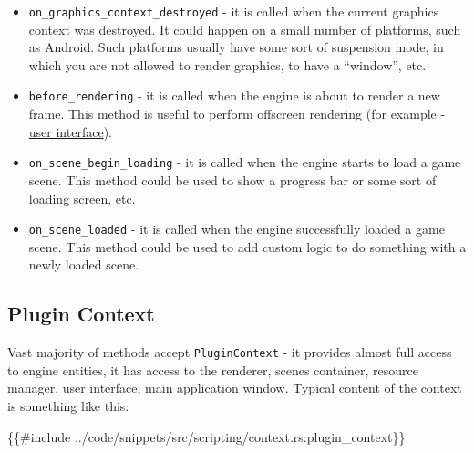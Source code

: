 \documentclass[
]{book}
\newenvironment{Shaded}{\begin{snugshade}}{\end{snugshade}}
\newcommand{\NormalTok}[1]{#1}
\theoremstyle{definition}
\theoremstyle{definition}
\theoremstyle{definition}
\theoremstyle{definition}
\theoremstyle{remark}
\begin{document}
\begin{itemize}
\item
  \texttt{on\_graphics\_context\_destroyed} - it is called when the current graphics context was destroyed. It could happen on a small number of platforms, such as Android. Such platforms usually have some sort of suspension mode, in which you are not allowed to render graphics, to have a ``window'', etc.
\item
  \texttt{before\_rendering} - it is called when the engine is about to render a new frame. This method is useful to perform offscreen rendering (for example - \href{../ui/rendering.md\#offscreen-rendering}{user interface}).
\item
  \texttt{on\_scene\_begin\_loading} - it is called when the engine starts to load a game scene. This method could be used to show a progress bar or some sort of loading screen, etc.
\item
  \texttt{on\_scene\_loaded} - it is called when the engine successfully loaded a game scene. This method could be used to add custom logic to do something with a newly loaded scene.
\end{itemize}

\subsection{Plugin Context}\label{plugin-context}

Vast majority of methods accept \texttt{PluginContext} - it provides almost full access to engine entities, it has access to the renderer, scenes container, resource manager, user interface, main application window. Typical content of the context is something like this:

\begin{Shaded}
\begin{Highlighting}[]
\NormalTok{\{\{\#include ../code/snippets/src/scripting/context.rs:plugin\_context\}\}}
\end{Highlighting}
\end{Shaded}
\end{document}
